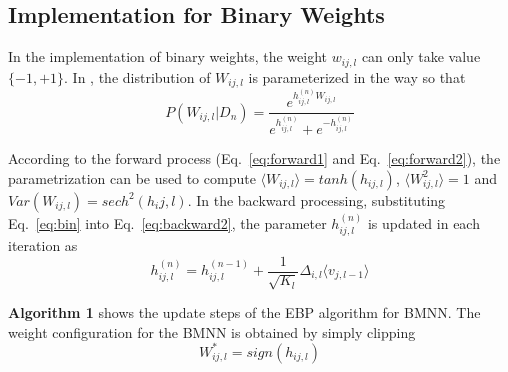 \documentclass{article} %
\begin{document}
\subsection{Implementation for Binary Weights}
In the implementation of binary weights, the weight $w_{ij,l}$ can only take value $\{-1,+1\}$. In \citet{Soudry14}, the distribution of $W_{ij,l}$ is parameterized in the way so that
\begin{equation} \label{eq:bin}
    P(W_{ij,l}|D_n) = \frac{e^{h^{(n)}_{ij,l}W_{ij,l}}}{e^{h^{(n)}_{ij,l}} + e^{-h^{(n)}_{ij,l}}}
\end{equation}

According to the forward process (Eq.~\ref{eq:forward1} and Eq.~\ref{eq:forward2}), the parametrization can be used to compute $\langle W_{ij,l} \rangle = tanh(h_{ij,l})$, $\langle W^2_{ij,l} \rangle = 1$ and $Var(W_{ij,l})=sech^2(h_ij,l)$. In the backward processing, substituting Eq.~\ref{eq:bin} into Eq.~\ref{eq:backward2}, the parameter $h^{(n)}_{ij,l}$ is updated in each iteration as
\begin{equation}
    h^{(n)}_{ij,l} = h^{(n-1)}_{ij,l} + \frac{1}{\sqrt{K_l}}{\Delta_{i,l}}{\langle v_{j,l-1} \rangle}
\end{equation}

\textbf{Algorithm 1} shows the update steps of the EBP algorithm for BMNN.  The weight configuration for the BMNN is obtained by simply clipping
\begin{equation}
   W^*_{ij,l}=sign(h_{ij,l})
\end{equation}
\end{document}

